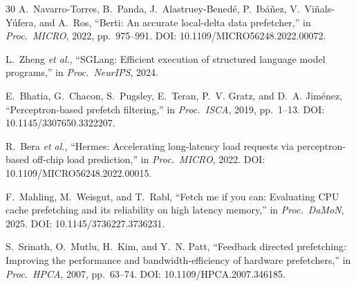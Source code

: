 \documentclass[conference]{IEEEtran}
\begin{document}
\begin{thebibliography}{30}
A.~Navarro-Torres, B.~Panda, J.~Alastruey-Bened\'{e}, P.~Ib\'{a}\~{n}ez,
V.~Vi\~{n}als-Y\'{u}fera, and A.~Ros,
``{Berti}: An accurate local-delta data prefetcher,''
in \emph{Proc.\ MICRO}, 2022, pp.~975--991.
\newblock DOI: 10.1109/MICRO56248.2022.00072.

L.~Zheng \emph{et al.},
``{SGLang}: Efficient execution of structured language model programs,''
in \emph{Proc.\ NeurIPS}, 2024.

E.~Bhatia, G.~Chacon, S.~Pugsley, E.~Teran, P.~V. Gratz, and D.~A. Jim\'{e}nez,
``Perceptron-based prefetch filtering,''
in \emph{Proc.\ ISCA}, 2019, pp.~1--13.
\newblock DOI: 10.1145/3307650.3322207.

R.~Bera \emph{et al.},
``{Hermes}: Accelerating long-latency load requests via perceptron-based
off-chip load prediction,''
in \emph{Proc.\ MICRO}, 2022.
\newblock DOI: 10.1109/MICRO56248.2022.00015.

F.~Mahling, M.~Weisgut, and T.~Rabl,
``Fetch me if you can: Evaluating {CPU} cache prefetching and its reliability
on high latency memory,''
in \emph{Proc.\ DaMoN}, 2025.
\newblock DOI: 10.1145/3736227.3736231.

S.~Srinath, O.~Mutlu, H.~Kim, and Y.~N. Patt,
``Feedback directed prefetching: Improving the performance and
bandwidth-efficiency of hardware prefetchers,''
in \emph{Proc.\ HPCA}, 2007, pp.~63--74.
\newblock DOI: 10.1109/HPCA.2007.346185.

\end{thebibliography}
\end{document}
